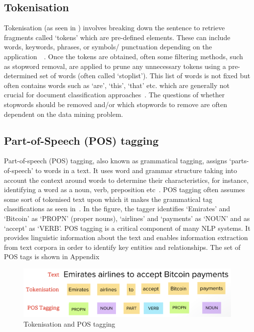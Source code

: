\subsection{Tokenisation}
Tokenisation (as seen in ) involves breaking down the sentence to retrieve fragments called `tokens' which are pre-defined elements. These can include words, keywords, phrases, or symbols/ punctuation depending on the application~\cite{kannan2014preprocessing}~\cite{ieee_named_entity}. Once the tokens are obtained, often some filtering methods, such as stopword removal, are applied to prune any unnecessary tokens using a pre-determined set of words (often called `stoplist'). This list of words is not fixed but often contains words such as `are', `this', `that' etc. which are generally not crucial for document classification approaches~\cite{kannan2014preprocessing}. The questions of whether stopwords should be removed and/or which stopwords to remove are often dependent on the data mining problem.  

\subsection{Part-of-Speech (POS) tagging}

Part-of-speech (POS) tagging, also known as grammatical tagging, assigns `parts-of-speech' to words in a text.  It uses word and grammar structure taking into account the context around words to determine their characteristics, for instance, identifying a word as a noun, verb, preposition etc~\cite{pos}. POS tagging often assumes some sort of tokenised text upon which it makes the grammatical tag classifications as seen in~. In the figure, the tagger identifies `Emirates' and `Bitcoin' as `PROPN' (proper nouns), `airlines' and `payments' as `NOUN' and as `accept' as `VERB'. POS tagging is a critical component of many NLP systems. It provides linguistic information about the text and enables information extraction from text corpora in order to identify key entities and relationships. 
The set of POS tags is shown in Appendix~

\begin{figure}[H]
\centering
\includegraphics[scale=0.35]{images/token+pos.png}
\caption{Tokenisation and POS tagging}
\label{fig:tokenisation+pos}
\end{figure}

